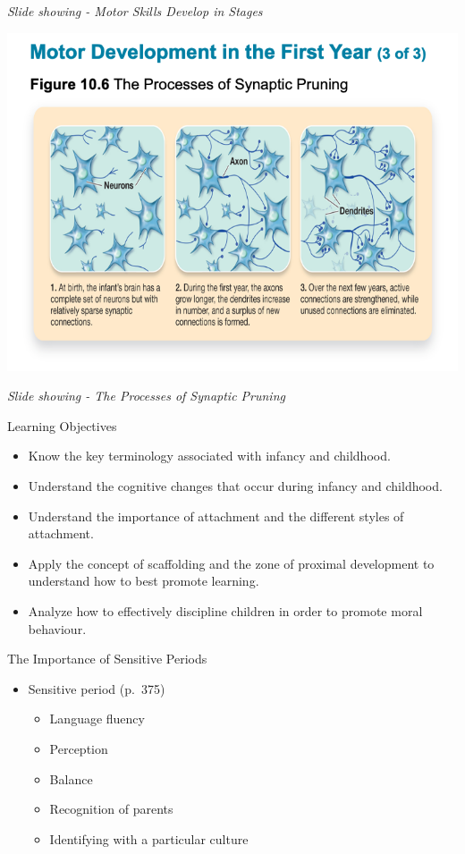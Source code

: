 \documentclass[
]{book}
\providecommand{\tightlist}{%
  \setlength{\itemsep}{0pt}\setlength{\parskip}{0pt}}
\begin{document}
\begin{reflect}
\emph{Slide showing - Motor Skills Develop in Stages}

\includegraphics{assets/unit_3/slide_20.png}

\emph{Slide showing - The Processes of Synaptic Pruning}

Learning Objectives

\begin{itemize}
\tightlist
\item
  Know the key terminology associated with infancy and childhood.\\
\item
  Understand the cognitive changes that occur during infancy and childhood.\\
\item
  Understand the importance of attachment and the different styles of attachment.\\
\item
  Apply the concept of scaffolding and the zone of proximal development to understand how to best promote learning.\\
\item
  Analyze how to effectively discipline children in order to promote moral behaviour.
\end{itemize}

The Importance of Sensitive Periods

\begin{itemize}
\tightlist
\item
  Sensitive period (p.~375)

  \begin{itemize}
  \tightlist
  \item
    Language fluency\\
  \item
    Perception\\
  \item
    Balance\\
  \item
    Recognition of parents\\
  \item
    Identifying with a particular culture
  \end{itemize}
\end{itemize}


\end{reflect}
\end{document}
